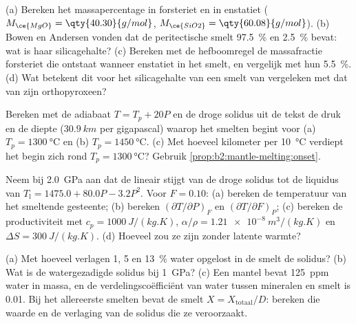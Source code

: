 \begin{exercise}[$\star\star$]\label{exo:b2:mantle-melting:6}
(a) Bereken het massapercentage  in forsteriet  en in
enstatiet  ($M_{\ce{MgO}} = \qty{40.30}{g/mol}$, $M_{\ce{SiO2}} =
\qty{60.08}{g/mol}$). (b) Bowen en Andersen vonden dat de peritectische smelt
\qty{97.5}{\percent}  en \qty{2.5}{\percent}  bevat: wat is haar
silicagehalte? (c) Bereken met de hefboomregel de massafractie forsteriet
die ontstaat wanneer enstatiet in het  smelt, en vergelijk met hun
\qty{5.5}{\percent}. (d) Wat betekent dit voor het silicagehalte van een smelt van
 vergeleken met dat van zijn orthopyroxeen?
\end{exercise}

\begin{exercise}[$\star\star$]\label{exo:b2:mantle-melting:7}
Bereken met de adiabaat $T = T_p + 20P$ en de droge solidus uit de tekst de
druk en de diepte ($\qty{30.9}{km}$ per gigapascal) waarop het smelten begint
voor (a) $T_p = \qty{1300}{\celsius}$ en (b) $T_p = \qty{1450}{\celsius}$. (c) Met
hoeveel kilometer per \qty{10}{\celsius} verdiept het begin zich rond
$T_p = \qty{1300}{\celsius}$? Gebruik \cref{prop:b2:mantle-melting:onset}.
\end{exercise}

\begin{exercise}[$\star\star$]\label{exo:b2:mantle-melting:8}
Neem bij \qty{2.0}{GPa} aan dat de  lineair stijgt van de droge solidus tot
de liquidus van  $T_{\mathrm l} = 1475.0 + 80.0P - 3.2P^2$. Voor $F = 0.10$:
(a) bereken de temperatuur van het smeltende gesteente; (b) bereken $(\partial
T/\partial P)_F$ en $(\partial T/\partial F)_P$; (c) bereken de productiviteit met
$c_p = \qty{1000}{J/(kg.K)}$, $\alpha/\rho = \qty{1.21e-8}{m^3/(kg.K)}$ en
$\Delta S = \qty{300}{J/(kg.K)}$. (d) Hoeveel zou ze zijn zonder latente warmte?
\end{exercise}

\begin{exercise}[$\star\star$]\label{exo:b2:mantle-melting:9}
(a) Met hoeveel verlagen 1, 5 en \qty{13}{\percent} water opgelost in de smelt
de solidus? (b) Wat is de watergezadigde solidus bij \qty{1}{GPa}? (c) Een mantel
bevat \qty{125}{ppm} water in massa, en de verdelingscoëfficiënt van water tussen
mineralen en smelt is 0.01. Bij het allereerste smelten bevat de smelt $X =
X_{\text{totaal}}/D$: bereken die waarde en de verlaging van de solidus die ze veroorzaakt.
\end{exercise}

